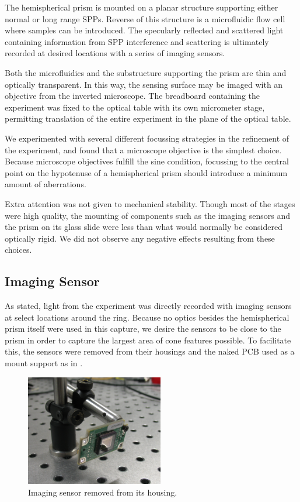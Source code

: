 The hemispherical prism is mounted on a planar structure supporting either
normal or long range SPPs.  Reverse of this structure is a microfluidic
flow cell where samples can be introduced.  The specularly reflected and
scattered light containing information from SPP interference and scattering
is ultimately recorded at desired locations with a series of imaging
sensors.

Both the microfluidics and the substructure supporting the prism are thin
and optically transparent.  In this way, the sensing surface may be imaged
with an objective from the inverted microscope.  The breadboard containing
the experiment was fixed to the optical table with its own micrometer
stage, permitting translation of the entire experiment in the plane of the
optical table.

We experimented with several different focussing strategies in the
refinement of the experiment, and found that a microscope objective is the
simplest choice.  Because microscope objectives fulfill the sine condition,
focussing to the central point on the hypotenuse of a hemispherical prism
should introduce a minimum amount of aberrations.

Extra attention was not given to mechanical stability.  Though most of the
stages were high quality, the mounting of components such as the imaging
sensors and the prism on its glass slide were less than what would normally be considered optically rigid.
We did not observe any negative effects resulting from these choices.

\subsection{Imaging Sensor}
As stated, light from the experiment was directly recorded with imaging
sensors at select locations around the ring.  Because no optics besides the
hemispherical prism itself were used in this capture, we desire the sensors
to be close to the prism in order to capture the largest area of cone
features possible.  To facilitate this, the sensors were removed from their
housings and the naked PCB used as a mount support as in
.
\begin{figure}[ht]
 \centering
 \includegraphics[width=6cm,keepaspectratio]{experimental/figures/nakedsensorcrop.jpg}
 \caption{Imaging sensor removed from its housing.}
 \label{fig:imagingsensor}
\end{figure}

